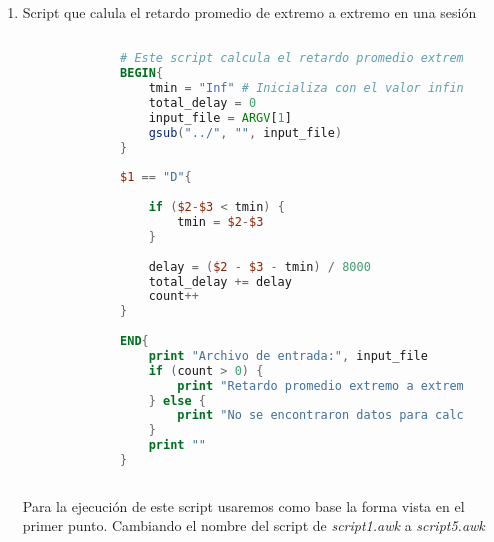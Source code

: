 \begin{enumerate}
\begin{figure}[H]
\begin{lstlisting}[frame=single, breaklines=true, basicstyle=\footnotesize\ttfamily, breakatwhitespace=false, 
        columns=flexible, tabsize=2, showstringspaces=false, language=AWK]
            session_time = ($3 - t1) / 8000
            end_to_end_delay = ($2 - $3 - tmin) / 8000
            print session_time, end_to_end_delay
        }
              
    \end{lstlisting}
    \label{fig:scriptTiempoSesionRetardoExtremoExtremo}
  \end{figure}

  \noindent A continuaci\'on se muestra el comando que se us\'o para la ejecuci\'on del script. Ya que se tiene que generar
  un archivo para cada una de las trazas 
  \begin{figure}[H]
    \centering
    \begin{lstlisting}[frame=single, breaklines=true, basicstyle=\footnotesize\ttfamily, breakatwhitespace=false, 
      columns=flexible, tabsize=2, showstringspaces=false, language=bash]

      awk -f ./script1.awk ../1.txt > ./output
      
    \end{lstlisting}
  \end{figure}

  \newpage
  \item Script que calula el retardo promedio de extremo a extremo en una sesi\'on
  \begin{figure}[H]
    \centering
    \begin{lstlisting}[frame=single, breaklines=true, basicstyle=\footnotesize\ttfamily, breakatwhitespace=false, 
        columns=flexible, tabsize=2, showstringspaces=false, language=AWK] 
  
        # Este script calcula el retardo promedio extremo a extremo.
        BEGIN{
            tmin = "Inf" # Inicializa con el valor infinito
            total_delay = 0
            input_file = ARGV[1]
            gsub("../", "", input_file)
        }
        
        $1 == "D"{
        
            if ($2-$3 < tmin) {
                tmin = $2-$3
            }
            
            delay = ($2 - $3 - tmin) / 8000
            total_delay += delay
            count++
        }
        
        END{
            print "Archivo de entrada:", input_file
            if (count > 0) {
                print "Retardo promedio extremo a extremo:", total_delay / count
            } else {
                print "No se encontraron datos para calcular el retardo promedio."
            }
            print ""
        }
                
    \end{lstlisting}
    \label{fig:scriptRetardoExtremoExtremoSesion}
  \end{figure}
  \noindent Para la ejecuci\'on de este script usaremos como base la forma vista en el primer punto. 
  Cambiando el nombre del script de \textit{script1.awk} a \textit{script5.awk}
\end{enumerate}